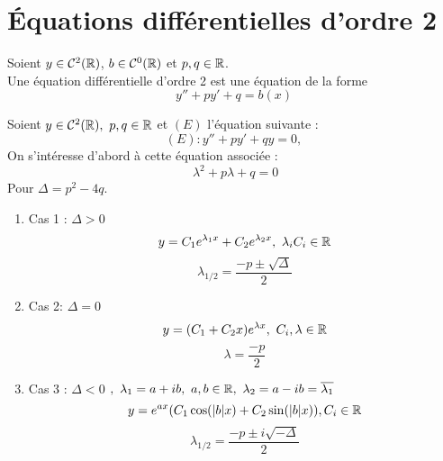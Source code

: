 \section{\'Equations différentielles d'ordre 2}

\begin{definition}
	Soient $y \in \mathcal{C}^2(\mathbb{R})$, $b \in \mathcal{C}^0(\mathbb{R})$ et $p, q \in \mathbb{R}$. \\
	Une équation différentielle d'ordre 2 est une équation de la forme
	\[ y'' + py' + q = b(x) \]
\end{definition}

\begin{theorem}
  Soient $y \in \mathcal{C}^2(\mathbb{R}),\ p, q \in \mathbb{R}$ et $(E)$ l'équation suivante :
  \[ (E) : y'' + py' + qy = 0, \]
  On s'intéresse d'abord à cette équation associée :
  \[ \ \lambda^{2} + p\lambda + q = 0 \]
  Pour $\Delta = p^2 - 4q$. 
  \begin{enumerate}
	\item Cas 1 :
		  $\Delta > 0$
		  \[ y = C_{1} e^{\lambda_{1} x} + C_{2} e^{\lambda_{2} x},\ \lambda_{i} C_{i} \in \mathbb{R} \]
        \[ \lambda_{1/2} = \frac{-p \pm \sqrt{\Delta}}{2} \]
	\item Cas 2:
		  $\Delta = 0$
		  \[ y = (C_{1} + C_{2}x) e^{\lambda x},\ C_{i}, \lambda \in \mathbb{R} \]
        \[ \lambda = \frac{-p}{2} \]
	\item Cas 3 :
		  $\Delta < 0$
		  $,\ \lambda_{1} = a + ib,\ a, b \in \R,\ \lambda_{2} = a - ib = \overline{\lambda_{1}}$
		  \[ y = e^{ax}(C_1 \cos(\abs{b}x) + C_2 \sin(\abs{b}x)), C_i \in \mathbb{R} \]
        \[ \lambda_{1/2} = \frac{-p \pm i \sqrt{-\Delta}}{2} \]
  \end{enumerate}
\end{theorem}

